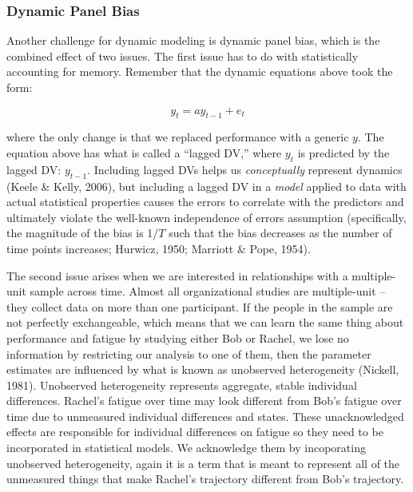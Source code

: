 \documentclass[english,,man]{apa6}
\begin{document}
\hypertarget{dynamic-panel-bias}{%
\subsubsection{Dynamic Panel Bias}\label{dynamic-panel-bias}}

Another challenge for dynamic modeling is dynamic panel bias, which is the combined effect of two issues. The first issue has to do with statistically accounting for memory. Remember that the dynamic equations above took the form:

\begin{equation}
y_{t} = a y_{t-1} + e_{t}
\end{equation}

\noindent where the only change is that we replaced performance with a generic \(y\). The equation above has what is called a \enquote{lagged DV,} where \(y_{t}\) is predicted by the lagged DV: \(y_{t-1}\). Including lagged DVs helps us \emph{conceptually} represent dynamics (Keele \& Kelly, 2006), but including a lagged DV in a \emph{model} applied to data with actual statistical properties causes the errors to correlate with the predictors and ultimately violate the well-known independence of errors assumption (specifically, the magnitude of the bias is 1/\(T\) such that the bias decreases as the number of time points increases; Hurwicz, 1950; Marriott \& Pope, 1954).

The second issue arises when we are interested in relationships with a multiple-unit sample across time. Almost all organizational studies are multiple-unit -- they collect data on more than one participant. If the people in the sample are not perfectly exchangeable, which means that we can learn the same thing about performance and fatigue by studying either Bob or Rachel, we lose no information by restricting our analysis to one of them, then the parameter estimates are influenced by what is known as unobserved heterogeneity (Nickell, 1981). Unobserved heterogeneity represents aggregate, stable individual differences. Rachel's fatigue over time may look different from Bob's fatigue over time due to unmeasured individual differences and states. These unacknowledged effects are responsible for individual differences on fatigue so they need to be incorporated in statistical models. We acknowledge them by incoporating unobserved heterogeneity, again it is a term that is meant to represent all of the unmeasured things that make Rachel's trajectory different from Bob's trajectory.
\end{document}

